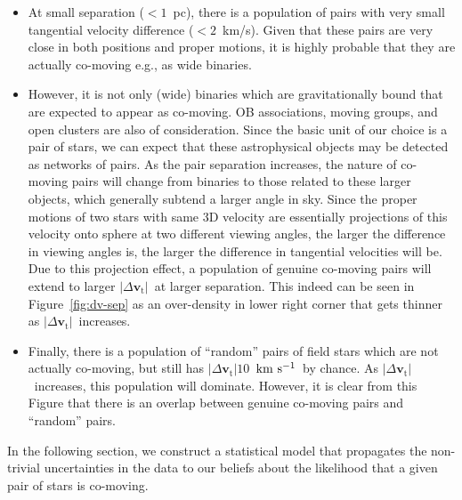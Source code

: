 \documentclass[manuscript, letterpaper]{aastex6}
\newcommand{\bs}[1]{\boldsymbol{#1}}
\renewcommand{\vec}[1]{\bs{#1}}
\newcommand{\kms}{\ensuremath{\rm km~s^{-1}}}
\newcommand{\absdvtan}{\ensuremath{|\Delta\vec v_\mathrm{t}|}}
\begin{document}
\begin{itemize}
  \item At small separation ($<1$~pc), there is a population of pairs with
  very small tangential velocity difference ($<2$~km/s). Given that these pairs
  are very close in both positions and proper motions,
  it is highly probable that they are actually co-moving e.g., as wide binaries.

  \item  However, it is not only (wide) binaries which are gravitationally
  bound that are expected to appear as co-moving.
  OB associations, moving groups, and open clusters are also of consideration.
  Since the basic unit of our choice is a pair of stars, we can expect that these astrophysical objects may be detected as networks of pairs.
  As the pair separation increases, the nature of co-moving pairs
  will change from binaries to those related to these larger objects,
  which generally subtend a larger angle in sky.
  Since the proper motions of two stars with same 3D velocity
  are essentially projections of this velocity onto sphere at
  two different viewing angles,
  the larger the difference in viewing angles is, the larger the difference in tangential
  velocities will be.
  Due to this projection effect, a population of genuine co-moving pairs
  will extend to larger \absdvtan\ at larger separation.
  This indeed can be seen in Figure~\ref{fig:dv-sep} as an over-density
  in lower right corner that gets thinner as \absdvtan\ increases.

  \item Finally, there is a population of “random” pairs of field stars
  which are not actually co-moving, but still has $\absdvtan 10$~\kms\
  by chance.
  As \absdvtan\ increases, this population will dominate.
  However, it is clear from this Figure that there is an overlap between
  genuine co-moving pairs and “random” pairs.
\end{itemize}

In the following section, we construct a statistical model that propagates
the non-trivial uncertainties in the data to our beliefs about the likelihood
that a given pair of stars is co-moving.
\end{document}
